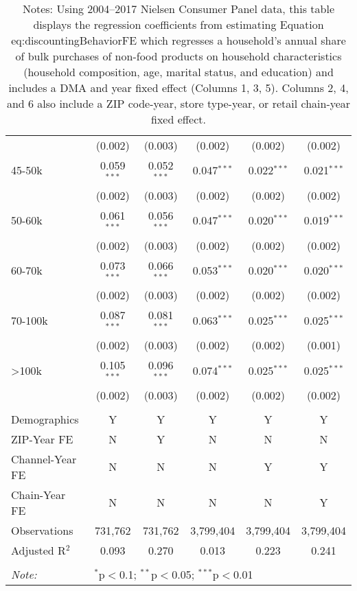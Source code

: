 \begin{table}[!htbp]
\begin{tabular}{@{\extracolsep{5pt}}lccccc}
  & (0.002) & (0.003) & (0.002) & (0.002) & (0.002) \\
  45-50k & 0.059$^{***}$ & 0.052$^{***}$ & 0.047$^{***}$ & 0.022$^{***}$ & 0.021$^{***}$ \\
  & (0.002) & (0.003) & (0.002) & (0.002) & (0.002) \\
  50-60k & 0.061$^{***}$ & 0.056$^{***}$ & 0.047$^{***}$ & 0.020$^{***}$ & 0.019$^{***}$ \\
  & (0.002) & (0.003) & (0.002) & (0.002) & (0.002) \\
  60-70k & 0.073$^{***}$ & 0.066$^{***}$ & 0.053$^{***}$ & 0.020$^{***}$ & 0.020$^{***}$ \\
  & (0.002) & (0.003) & (0.002) & (0.002) & (0.002) \\
  70-100k & 0.087$^{***}$ & 0.081$^{***}$ & 0.063$^{***}$ & 0.025$^{***}$ & 0.025$^{***}$ \\
  & (0.002) & (0.003) & (0.002) & (0.002) & (0.001) \\
  >100k & 0.105$^{***}$ & 0.096$^{***}$ & 0.074$^{***}$ & 0.025$^{***}$ & 0.025$^{***}$ \\
  & (0.002) & (0.003) & (0.002) & (0.002) & (0.002) \\
 \hline \\[-1.8ex]
Demographics & Y & Y & Y & Y & Y \\
ZIP-Year FE & N & Y & N & N & N \\
Channel-Year FE & N & N & N & Y & Y \\
Chain-Year FE & N & N & N & N & Y \\
Observations & 731,762 & 731,762 & 3,799,404 & 3,799,404 & 3,799,404 \\
Adjusted R$^{2}$ & 0.093 & 0.270 & 0.013 & 0.223 & 0.241 \\
\hline
\hline \\[-1.8ex]
\textit{Note:}  & \multicolumn{5}{l}{$^{*}$p$<$0.1; $^{**}$p$<$0.05; $^{***}$p$<$0.01}
\end{tabular}
\caption*{Notes: Using 2004--2017 Nielsen Consumer Panel data, this table displays the regression coefficients from estimating Equation {eq:discountingBehaviorFE} which regresses a household's annual share of bulk purchases of non-food products on household characteristics (household composition, age, marital status, and education) and includes a DMA and year fixed effect (Columns 1, 3, 5). Columns 2, 4, and 6 also include a ZIP code-year, store type-year, or retail chain-year fixed effect.}
\end{table}
